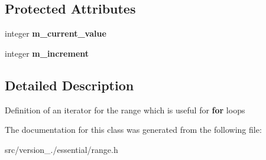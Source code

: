 \subsection*{Protected Attributes}
\begin{DoxyCompactItemize}
\item 
\mbox{\label{classez_1_1essential_1_1Range_1_1iterator_ab5508b933297f8afa3d23327d22927e9}} 
integer {\bfseries m\+\_\+current\+\_\+value}
\item 
\mbox{\label{classez_1_1essential_1_1Range_1_1iterator_a2ef5060eceb33714aa3fd978af5f9a59}} 
integer {\bfseries m\+\_\+increment}
\end{DoxyCompactItemize}


\subsection{Detailed Description}
Definition of an iterator for the range which is useful for {\bfseries for} loops 

The documentation for this class was generated from the following file\+:\begin{DoxyCompactItemize}
\item 
src/version\+\_./essential/range.\+h\end{DoxyCompactItemize}
